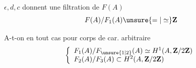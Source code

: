 $\epsilon,d,c$ donnent une filtration de $F(A)$
\[
F(A)/F_1(A)\unsure{=|\simeq}\mathbf Z
\]


A-t-on en tout cas pour corps de car. arbitraire
\[
\left\{\begin{array}{l}
F_1(A)/F_{\unsure{1|2}}(A)\simeq H^1(A,\mathbf Z/2\mathbf Z)\\
F_2(A)/F_3(A)\subset H^2(A,\mathbf Z/2\mathbf Z)
\end{array}\right.
\]
